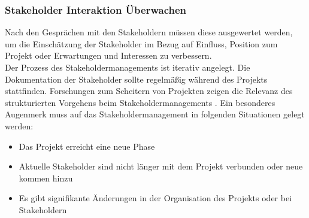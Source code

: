 \documentclass[ThesisDJ.tex]{subfiles}
\begin{document}
\subsubsection{Stakeholder Interaktion Überwachen}
Nach den Gesprächen mit den Stakeholdern müssen diese ausgewertet werden, um die Einschätzung der Stakeholder im Bezug auf Einfluss,
Position zum Projekt oder Erwartungen und Interessen zu verbessern.\\
Der Prozess des Stakeholdermanagements ist iterativ angelegt. Die Dokumentation der Stakeholder sollte regelmäßig während
des Projekts stattfinden. Forschungen zum Scheitern von Projekten zeigen die Relevanz des strukturierten Vorgehens 
beim Stakeholdermanagements \cite[S.~488]{project_management_institute_guide_2017}.
Ein besonderes Augenmerk muss auf das Stakeholdermanagement in folgenden Situationen gelegt werden:

\begin{itemize}
	\item Das Projekt erreicht eine neue Phase
	\item Aktuelle Stakeholder sind nicht länger mit dem Projekt verbunden oder neue kommen hinzu
	\item Es gibt signifikante Änderungen in der Organisation des Projekts oder bei Stakeholdern
\end{itemize}
	
\end{document}
